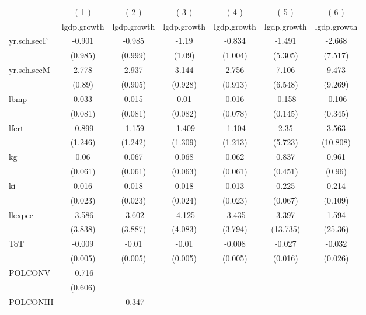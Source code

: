 \documentclass{article}\usepackage{graphicx, color}
\begin{document}
\begin{table}
\centering
\small
\begin{tabular}{l*{6}{c}}
\hline\hline
	 &\multicolumn{1}{c}{( 1 )}  	 &\multicolumn{1}{c}{( 2 )}  	 &\multicolumn{1}{c}{( 3 )}  	 &\multicolumn{1}{c}{( 4 )}  	 &\multicolumn{1}{c}{( 5 )}  	 &\multicolumn{1}{c}{( 6 )}  \\  &\multicolumn{1}{c}{lgdp.growth} &\multicolumn{1}{c}{lgdp.growth} &\multicolumn{1}{c}{lgdp.growth} &\multicolumn{1}{c}{lgdp.growth} &\multicolumn{1}{c}{lgdp.growth} &\multicolumn{1}{c}{lgdp.growth} \\
\hline
yr.sch.secF 		&-0.901 		&-0.985 		&-1.19 		&-0.834 		&-1.491 		&-2.668 \\
  		&(0.985) 		&(0.999) 		&(1.09) 		&(1.004) 		&(5.305) 		&(7.517) \\
yr.sch.secM 		&2.778\sym{***} 		&2.937\sym{***} 		&3.144\sym{***} 		&2.756\sym{***} 		&7.106 		&9.473 \\
  		&(0.89) 		&(0.905) 		&(0.928) 		&(0.913) 		&(6.548) 		&(9.269) \\
lbmp 		&0.033 		&0.015 		&0.01 		&0.016 		&-0.158 		&-0.106 \\
  		&(0.081) 		&(0.081) 		&(0.082) 		&(0.078) 		&(0.145) 		&(0.345) \\
lfert 		&-0.899 		&-1.159 		&-1.409 		&-1.104 		&2.35 		&3.563 \\
  		&(1.246) 		&(1.242) 		&(1.309) 		&(1.213) 		&(5.723) 		&(10.808) \\
kg 		&0.06 		&0.067 		&0.068 		&0.062 		&0.837 		&0.961 \\
  		&(0.061) 		&(0.061) 		&(0.063) 		&(0.061) 		&(0.451) 		&(0.96) \\
ki 		&0.016 		&0.018 		&0.018 		&0.013 		&0.225\sym{*} 		&0.214 \\
  		&(0.023) 		&(0.023) 		&(0.024) 		&(0.023) 		&(0.067) 		&(0.109) \\
llexpec 		&-3.586 		&-3.602 		&-4.125 		&-3.435 		&3.397 		&1.594 \\
  		&(3.838) 		&(3.887) 		&(4.083) 		&(3.794) 		&(13.735) 		&(25.36) \\
ToT 		&-0.009\sym{*} 		&-0.01\sym{*} 		&-0.01\sym{*} 		&-0.008 		&-0.027 		&-0.032 \\
  		&(0.005) 		&(0.005) 		&(0.005) 		&(0.005) 		&(0.016) 		&(0.026) \\
POLCONV 		&-0.716 		& 		& 		& 		& 		& \\
  		&(0.606) 		& 		& 		& 		& 		& \\
POLCONIII 		& 		&-0.347 		& 		& 		& 		& \\

\end{tabular}
\end{table}
\end{document}
